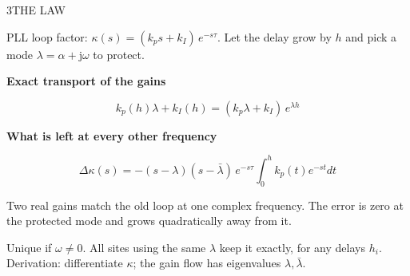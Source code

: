 \begin{minipage}[t][\PosterTopRowHeight][t]{\PosterThreeWidth}\vspace{0pt}
  \begin{TicketTwoPanel}{\PosterTopRowHeight}{3}{THE LAW}

    {\FigureSize PLL loop factor: $\kappa(s)=(k_p s+k_I)\,e^{-s\tau}$. Let the delay grow by $h$ and pick a mode $\lambda=\alpha+\mathrm{j}\omega$ to protect.\par}
    \vspace{1mm}
    {\FigureSize\textbf{Exact transport of the gains}\par}
    {\EquationSize\color{IASBlue}\[
      k_p(h)\lambda+k_I(h)=(k_p\lambda+k_I)\,e^{\lambda h}
    \]}
    \vspace{-2mm}
    {\FigureSize\textbf{What is left at every other frequency}\par}
    {\fontsize{29pt}{34pt}\selectfont\color{IASBlue}\[
      \Delta\kappa(s)=-(s-\lambda)(s-\bar\lambda)\,e^{-s\tau}\!\!\int_0^h\!\! k_p(t)e^{-st}dt
    \]}
    \vspace{-1mm}
    \begin{InWords}\InWordsLabel Two real gains match the old loop at one complex frequency. The error is zero at the protected mode and grows quadratically away from it.\end{InWords}
    \vspace{2mm}
    {\FigureSize Unique if $\omega\neq0$. All sites using the same $\lambda$ keep it exactly, for any delays $h_i$. Derivation: differentiate $\kappa$; the gain flow has eigenvalues $\lambda,\bar\lambda$.\par}

  \end{TicketTwoPanel}
\end{minipage}%
